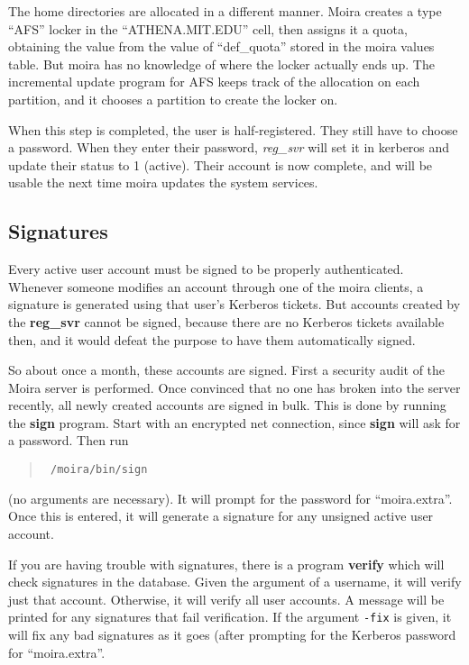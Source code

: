 \documentclass{book}
\begin{document}
The home directories are allocated in a different manner.  Moira
creates a type ``AFS'' locker in the ``ATHENA.MIT.EDU'' cell, then
assigns it a quota, obtaining the value from the value of
``def\_quota'' stored in the moira values table.  But moira has no
knowledge of where the locker actually ends up.  The incremental
update program for AFS keeps track of the allocation on each
partition, and it chooses a partition to create the locker on.

When this step is completed, the user is half-registered.  They still
have to choose a password.  When they enter their password, {\em
reg\_svr} will set it in kerberos and update their status to 1
(active).  Their account is now complete, and will be usable the next
time moira updates the system services.

\subsection{Signatures}

Every active user account must be signed to be properly authenticated.
Whenever someone modifies an account through one of the moira clients,
a signature is generated using that user's Kerberos tickets.  But
accounts created by the {\bf reg\_svr} cannot be signed, because there
are no Kerberos tickets available then, and it would defeat the
purpose to have them automatically signed.

So about once a month, these accounts are signed.  First a security
audit of the Moira server is performed.  Once convinced that no one
has broken into the server recently, all newly created accounts are
signed in bulk.  This is done by running the {\bf sign} program.
Start with an encrypted net connection, since {\bf sign} will ask for
a password.  Then run
\begin{quotation}\tt
/moira/bin/sign
\end{quotation}
(no arguments are necessary).  It will prompt for the password for
``moira.extra''.  Once this is entered, it will generate a signature
for any unsigned active user account.

If you are having trouble with signatures, there is a program {\bf
verify} which will check signatures in the database.  Given the
argument of a username, it will verify just that account.  Otherwise,
it will verify all user accounts.  A message will be printed for any
signatures that fail verification.  If the argument {\tt -fix} is
given, it will fix any bad signatures as it goes (after prompting for
the Kerberos password for ``moira.extra''.
\end{document}
